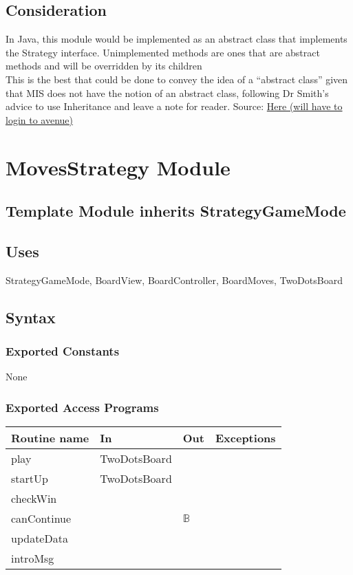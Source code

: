 \documentclass[12pt]{article}
\begin{document}
\subsection* {Consideration}
\noindent In Java, this module would be implemented as an abstract class that implements the Strategy interface. Unimplemented methods are ones that are abstract methods and will be overridden by its children\\
\noindent This is the best that could be done to convey the idea of a ``abstract class'' given that MIS does not have the notion of an abstract class, following Dr Smith's advice to use Inheritance and leave a note for reader. Source: \href{https://avenue.cllmcmaster.ca/d2l/le/296632/discussions/threads/1286234/View?groupFilterOption=0&searchText=abstract} {Here (will have to login to avenue)}

\newpage

\section* {MovesStrategy Module}

\subsection* {Template Module inherits StrategyGameMode}


\subsection*{Uses}
StrategyGameMode, BoardView, BoardController, BoardMoves, TwoDotsBoard

\subsection* {Syntax}

\subsubsection* {Exported Constants}

None

\subsubsection* {Exported Access Programs}

\begin{tabular}{| l | l | l | p{6cm} |}
\hline
\textbf{Routine name} & \textbf{In} & \textbf{Out} & \textbf{Exceptions}\\
\hline
play & TwoDotsBoard & & \\
\hline
startUp & TwoDotsBoard & & \\
\hline
checkWin & & & \\
\hline
canContinue &  & $\mathbb{B}$ & \\
\hline
updateData &  & & \\
\hline
introMsg & & & \\
\hline
\end{tabular}
\end{document}
